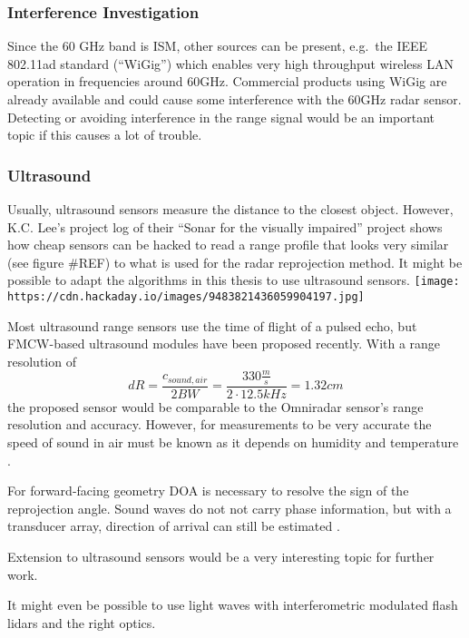 \subsubsection{Interference
Investigation}\label{interference-investigation}

Since the 60 GHz band is ISM, other sources can be present, e.g.~the
IEEE 802.11ad standard \cite{IEEE2014} (``WiGig'') which enables very
high throughput wireless LAN operation in frequencies around 60GHz.
Commercial products using WiGig are already available and could cause
some interference with the 60GHz radar sensor. Detecting or avoiding
interference in the range signal would be an important topic if this
causes a lot of trouble.

\subsubsection{Ultrasound}\label{ultrasound}

Usually, ultrasound sensors measure the distance to the closest object.
However, K.C. Lee's project log of their ``Sonar for the visually
impaired'' project \cite{Lee2015} shows how cheap sensors can be hacked
to read a range profile that looks very similar (see figure \#REF) to
what is used for the radar reprojection method. It might be possible to
adapt the algorithms in this thesis to use ultrasound sensors.
\texttt{[image: https://cdn.hackaday.io/images/9483821436059904197.jpg]}

Most ultrasound range sensors use the time of flight of a pulsed echo,
but FMCW-based ultrasound modules have been proposed
\cite{Battaglini2014} recently. With a range resolution of
\[dR = \frac{c_{sound, air}}{2 BW} = \frac{330 \frac{m}{s}}{2\cdot 12.5kHz} = 1.32 cm\]
the proposed sensor would be comparable to the Omniradar sensor's range
resolution and accuracy. However, for measurements to be very accurate
the speed of sound in air must be known as it depends on humidity and
temperature \cite{Bohn1987}.

For forward-facing geometry DOA is necessary to resolve the sign of the
reprojection angle. Sound waves do not not carry phase information, but
with a transducer array, direction of arrival can still be estimated
\cite{Kunin2010}.

Extension to ultrasound sensors would be a very interesting topic for
further work.

It might even be possible to use light waves with interferometric
modulated flash lidars and the right optics.

